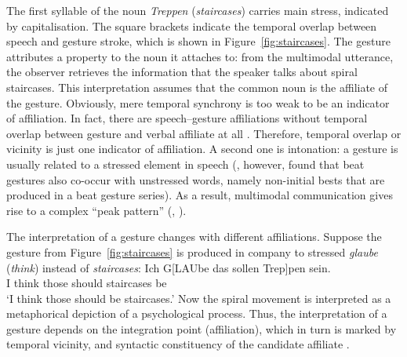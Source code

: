 \documentclass[output=paper
 	        ,biblatex
                ,babelshorthands
                ,newtxmath
                ,draftmode
                ,colorlinks, citecolor=brown
]{langscibook}
\begin{document}
\noindent The first syllable of the  noun \textit{Treppen} (\textit{staircases}) carries main stress, indicated by capitalisation. 
%
The square brackets indicate the temporal overlap between speech and gesture stroke, which is shown in Figure~\ref{fig:staircases}.
%
The gesture attributes a property to the noun it attaches to: from the multimodal utterance, the observer retrieves the information that the speaker talks about spiral staircases. 
%
This interpretation assumes that the common noun is the affiliate of the gesture.
%
Obviously, mere temporal synchrony is too weak to be an indicator of affiliation.
%
In fact, there are speech--gesture affiliations without temporal overlap between gesture and verbal affiliate at all \citep[e.g.][]{Luecking:Rieser:Stegmann:2004}.
%
Therefore, temporal overlap or vicinity is just one indicator of affiliation. A second one is intonation: a gesture is usually related to a stressed element in speech \citep[]{Loehr:2007} (\citealp{McClave:1994}, however, found that beat gestures also co-occur with unstressed words, namely non-initial bests that are produced in a beat gesture series).
%
As a result, multimodal communication gives rise to a complex \enquote{peak pattern} (\citealp[]{Tuite:1993}, \citealp[]{Loehr:2004}).


The interpretation of a gesture changes with different affiliations.
%
Suppose the gesture from Figure~\ref{fig:staircases} is produced in company to stressed \textit{glaube} (\textit{think}) instead of \textit{staircases}: 
%
\ea \label{ex:think}
\gll Ich G[LAUbe das sollen Trep]pen sein.\\
     I think those should staircases be \\
\glt \enquote*{I think those should be staircases.}
\z
%
Now the spiral movement is interpreted as a metaphorical depiction of a psychological process.
%
Thus, the interpretation of a gesture depends on the integration point (affiliation), which in turn is marked by temporal vicinity,  and syntactic constituency of the candidate affiliate \citep{Alahverdzhieva:Lascarides:Flickinger:2017}.
\end{document}
